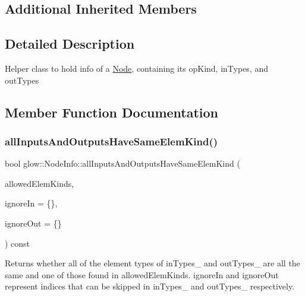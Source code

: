 \subsection*{Additional Inherited Members}


\subsection{Detailed Description}
Helper class to hold info of a \hyperlink{classglow_1_1_node}{Node}, containing its {\ttfamily op\+Kind}, {\ttfamily in\+Types}, and {\ttfamily out\+Types} 

\subsection{Member Function Documentation}
\mbox{\label{classglow_1_1_node_info_aea1836c8e7b145dff07b80342485a5ff}} 
\subsubsection{\texorpdfstring{all\+Inputs\+And\+Outputs\+Have\+Same\+Elem\+Kind()}{allInputsAndOutputsHaveSameElemKind()}}
{\footnotesize\ttfamily bool glow\+::\+Node\+Info\+::all\+Inputs\+And\+Outputs\+Have\+Same\+Elem\+Kind (\begin{DoxyParamCaption}\item[{llvm\+::\+Array\+Ref$<$ \hyperlink{namespaceglow_ab92e14a94329daf4083db670e95fbcdf}{Elem\+Kind} $>$}]{allowed\+Elem\+Kinds,  }\item[{const Indices\+Set \&}]{ignore\+In = {\ttfamily \{\}},  }\item[{const Indices\+Set \&}]{ignore\+Out = {\ttfamily \{\}} }\end{DoxyParamCaption}) const\hspace{0.3cm}{\ttfamily [inline]}}

\begin{DoxyReturn}{Returns}
whether all of the element types of in\+Types\+\_\+ and out\+Types\+\_\+ are all the same and one of those found in {\ttfamily allowed\+Elem\+Kinds}. {\ttfamily ignore\+In} and {\ttfamily ignore\+Out} represent indices that can be skipped in in\+Types\+\_\+ and out\+Types\+\_\+ respectively. 
\end{DoxyReturn}
\mbox{\label{classglow_1_1_node_info_ad3444cb445c3a8d9e8bbbd4601f989e7}} 
